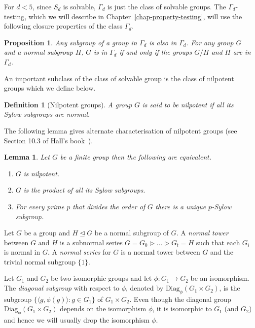 \documentclass[11pt]{madras}%
\newtheorem{lemma}[theorem]{Lemma}
\newtheorem{proposition}[theorem]{Proposition}
\newtheorem{definition}[theorem]{Definition}
\theoremstyle{remark}
\newcommand{\Diag}[2][]{{\ensuremath{\mathrm{Diag}_{{#1}}\left(#2\right)}}}
\newcommand{\nomclgroups}[3][]{{\nomenclature[g#1]{#2}{#3}}}
\begin{document}
For $d < 5$, since $S_d$ is solvable, $\Gamma_d$ is just the class of
solvable groups. The $\Gamma_d$-testing, which we will describe in
Chapter~\ref{chap-property-testing}, will use the following closure
properties of the class $\Gamma_d$.

\begin{proposition}\label{prop-gammad-closure}%
  Any subgroup of a group in $\Gamma_d$ is also in $\Gamma_d$. For any
  group $G$ and a normal subgroup $H$, $G$ is in $\Gamma_d$ if and
  only if the groups $G/H$ and $H$ are in $\Gamma_d$.
\end{proposition}


An important subclass of the class of solvable group is the class of
nilpotent groups which we define below.

\begin{definition}[Nilpotent groups]%
  A group $G$ is said to be nilpotent if all its Sylow subgroups are
  normal.
\end{definition}

The following lemma gives alternate characterisation of nilpotent
groups (see Section 10.3 of Hall's book~\cite{hall}).

\begin{lemma}\label{lem-nilpotent-equivalent}
  Let $G$ be a finite group then the following are equivalent.
  \begin{enumerate}
  \item $G$ is nilpotent.
  \item $G$ is the product of all its Sylow subgroups.
  \item For every prime $p$ that divides the order of $G$ there is a
    unique $p$-Sylow subgroup.
  \end{enumerate}
\end{lemma}


Let $G$ be a group and $H \unlhd G$ be a normal subgroup of $G$. A
\emph{normal tower} between $G$ and $H$ is a subnormal series $G = G_0
\rhd \ldots \rhd G_t = H$ such that each $G_i$ is normal in $G$. A
\emph{normal series} for $G$ is a normal tower between $G$ and the
trivial normal subgroup $\{ 1 \}$.%
%
%


Let $G_1$ and $G_2$ be two isomorphic groups and let $\phi : G_1 \to
G_2$ be an isomorphism. The \emph{diagonal subgroup}%
 with respect to $\phi$, denoted by
$\Diag[\phi]{G_1\times G_2}$, is the subgroup $\{ \langle g , \phi(g)
\rangle : g \in G_1 \}$ of $G_1 \times G_2$. Even though the diagonal
group $\Diag[\phi]{G_1 \times G_2}$ depends on the isomorphism $\phi$,
it is isomorphic to $G_1$ (and $G_2$) and hence we will usually drop
the isomorphism $\phi$.
%
\nomclgroups{$\Diag{G_1\times G_2}$}{diagonal subgroup of $G_1 \times
  G_2$\refpage}
%
\end{document}
